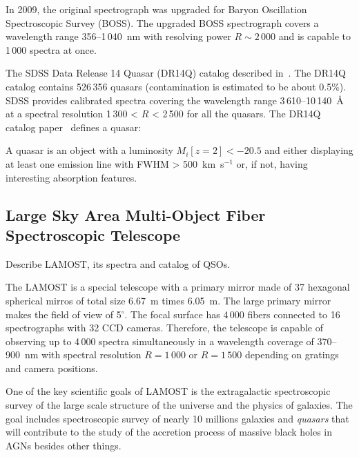 In 2009, the original spectrograph was upgraded for Baryon Oscillation Spectroscopic Survey (BOSS).
The upgraded BOSS spectrograph covers a wavelength range 356--1\,040~nm
with resolving power \(R \sim 2\,000\)
and is capable to 1\,000 spectra at once.~\cite{smee2013}


The SDSS Data Release 14 Quasar (DR14Q) catalog described in~\cite{paris2018}. %
The DR14Q catalog contains 526\,356 quasars (contamination is estimated to be about 0.5\%).
SDSS provides calibrated spectra covering the wavelength range 3\,610--10\,140~\AA{} at a spectral resolution 1\,300 < \(R\) < 2\,500 for all the quasars.
The DR14Q catalog paper~\cite{paris2018} defines a quasar:

\begin{definition}
	A quasar is an object with a luminosity \(M_i[z = 2] < -20.5\)
	and either displaying at least one emission line with FWHM > 500~km~s\(^{-1}\) or,
	if not, having interesting absorption features.
	\label{qso_definition}
\end{definition}

\subsection{Large Sky Area Multi-Object Fiber Spectroscopic Telescope}
\label{lamost}

Describe LAMOST, its spectra and catalog of QSOs.

The LAMOST is a special telescope with a primary mirror made of 37 hexagonal spherical mirros of total size 6.67~m times 6.05~m.
The large primary mirror makes the field of view of 5\(^{\circ}\).
The focal surface has 4\,000 fibers connected to 16 spectrographs with 32 CCD cameras.
Therefore, the telescope is capable of observing up to 4\,000 spectra simultaneously
in a wavelength coverage of 370--900~nm with spectral resolution \(R = 1\,000\) or \(R = 1\,500\) depending on gratings and camera positions.~\cite{cui2012}

One of the key scientific goals of LAMOST is the extragalactic spectroscopic survey of the large scale structure of the universe and the physics of galaxies.
The goal includes spectroscopic survey of nearly 10 millions galaxies and \textit{quasars}
that will contribute to the study of the accretion process of massive black holes in AGNs besides other things.~\cite{cui2012}

